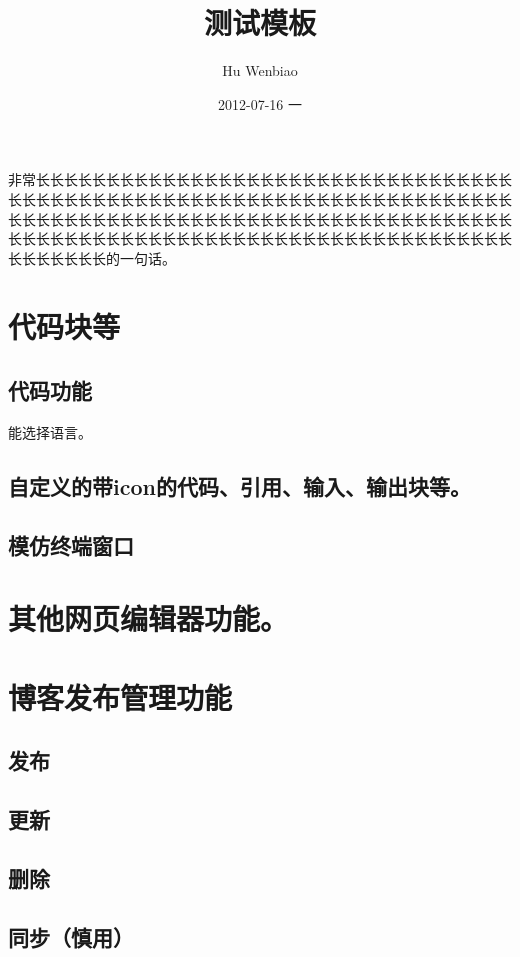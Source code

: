 \documentclass[11pt]{article}
\title{测试模板}
\author{Hu Wenbiao}
\date{2012-07-16 一}
\begin{document}
\maketitle

\setcounter{tocdepth}{3}
\tableofcontents
\vspace*{1cm}
非常长长长长长长长长长长长长长长长长长长长长长长长长长长长长长长长长长长长长长长长长长长长长长长长长长长长长长长长长长长长长长长长长长长长长长长长长长长长长长长长长长长长长长长长长长长长长长长长长长长长长长长长长长长长长长长长长长长长长长长长长长长长长长长长长长长长长长长长长长长长长长长长长长长长长长的一句话。
\section{代码块等}
\label{sec-1}
\subsection{代码功能}
\label{sec-1-1}

   能选择语言。
\subsection{自定义的带icon的代码、引用、输入、输出块等。}
\label{sec-1-2}
\subsection{模仿终端窗口}
\label{sec-1-3}
\section{其他网页编辑器功能。}
\label{sec-2}
\section{博客发布管理功能}
\label{sec-3}
\subsection{发布}
\label{sec-3-1}
\subsection{更新}
\label{sec-3-2}
\subsection{删除}
\label{sec-3-3}
\subsection{同步（慎用）}
\label{sec-3-4}
\end{document}
